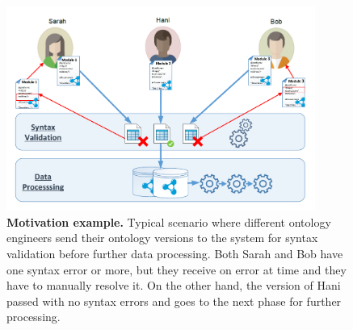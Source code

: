 	\begin{figure}[ht]
			\includegraphics[width=0.9\textwidth]{images/motivation.pdf}
			\caption{\textbf{Motivation example.} Typical scenario where different ontology engineers send their ontology versions to the system for syntax validation before further data processing.
			Both Sarah and Bob have one syntax error or more, but they receive on error at time and they have to manually resolve it.
			On the other hand, the version of Hani passed with no syntax errors and goes to the next phase for further processing.}
			\label{Fig:Motivation}
	\end{figure}



